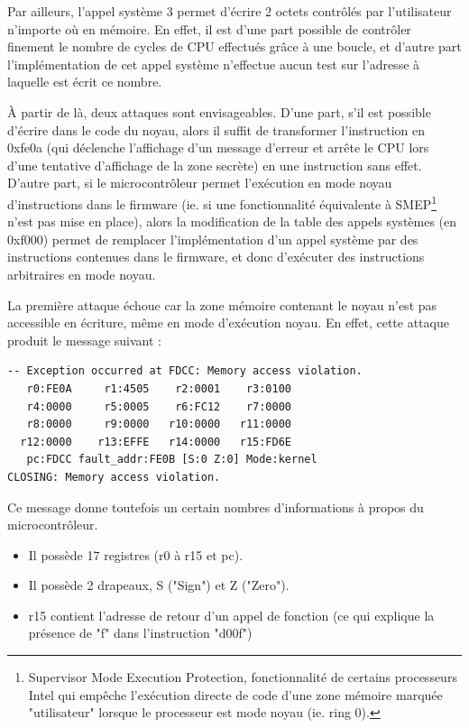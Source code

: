 \documentclass[a4paper,10pt]{article}
\begin{document}
Par ailleurs, l'appel système 3 permet d'écrire 2 octets contrôlés par l'utilisateur n'importe où en mémoire. En effet, il est d'une part possible de contrôler finement le nombre de cycles de CPU effectués grâce à une boucle, et d'autre part l'implémentation de cet appel système n'effectue aucun test sur l'adresse à laquelle est écrit ce nombre.

À partir de là, deux attaques sont envisageables. D'une part, s'il est possible d'écrire dans le code du noyau, alors il suffit de transformer l'instruction en 0xfe0a (qui déclenche l'affichage d'un message d'erreur et arrête le CPU lors d'une tentative d'affichage de la zone secrète) en une instruction sans effet. D'autre part, si le microcontrôleur permet l'exécution en mode noyau d'instructions dans le firmware (ie. si une fonctionnalité équivalente à SMEP\footnote{Supervisor Mode Execution Protection, fonctionnalité de certains processeurs Intel qui empêche l'exécution directe de code d'une zone mémoire marquée "utilisateur" lorsque le processeur est mode noyau (ie. ring 0).} n'est pas mise en place), alors la modification de la table des appels systèmes (en 0xf000) permet de remplacer l'implémentation d'un appel système par des instructions contenues dans le firmware, et donc d'exécuter des instructions arbitraires en mode noyau.

La première attaque échoue car la zone mémoire contenant le noyau n'est pas accessible en écriture, même en mode d'exécution noyau. En effet, cette attaque produit le message suivant :
\begin{verbatim}
-- Exception occurred at FDCC: Memory access violation.
   r0:FE0A     r1:4505    r2:0001    r3:0100
   r4:0000     r5:0005    r6:FC12    r7:0000
   r8:0000     r9:0000   r10:0000   r11:0000
  r12:0000    r13:EFFE   r14:0000   r15:FD6E
   pc:FDCC fault_addr:FE0B [S:0 Z:0] Mode:kernel
CLOSING: Memory access violation.
\end{verbatim}

Ce message donne toutefois un certain nombres d'informations à propos du microcontrôleur.
\begin{itemize}
\item Il possède 17 registres (r0 à r15 et pc).
\item Il possède 2 drapeaux, S ("Sign") et Z ("Zero").
\item r15 contient l'adresse de retour d'un appel de fonction (ce qui explique la présence de "f" dans l'instruction "d00f")
\end{itemize}
\end{document}

